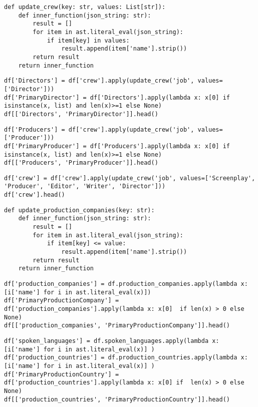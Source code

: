 \begin{lstlisting}
def update_crew(key: str, values: List[str]):
    def inner_function(json_string: str):
        result = []
        for item in ast.literal_eval(json_string):
            if item[key] in values:
                result.append(item['name'].strip())
        return result
    return inner_function
\end{lstlisting}

\begin{lstlisting}
df['Directors'] = df['crew'].apply(update_crew('job', values=['Director']))
df['PrimaryDirector'] = df['Directors'].apply(lambda x: x[0] if isinstance(x, list) and len(x)>=1 else None)
df[['Directors', 'PrimaryDirector']].head()
\end{lstlisting}

\begin{lstlisting}
df['Producers'] = df['crew'].apply(update_crew('job', values=['Producer']))
df['PrimaryProducer'] = df['Producers'].apply(lambda x: x[0] if isinstance(x, list) and len(x)>=1 else None)
df[['Producers', 'PrimaryProducer']].head()
\end{lstlisting}

\begin{lstlisting}
df['crew'] = df['crew'].apply(update_crew('job', values=['Screenplay', 'Producer', 'Editor', 'Writer', 'Director']))
df['crew'].head()
\end{lstlisting}

\begin{lstlisting}
def update_production_companies(key: str):
    def inner_function(json_string: str):
        result = []
        for item in ast.literal_eval(json_string):
            if item[key] <= value:
                result.append(item['name'].strip())
        return result
    return inner_function
\end{lstlisting}

\begin{lstlisting}
df['production_companies'] = df.production_companies.apply(lambda x: [i['name'] for i in ast.literal_eval(x)])
df['PrimaryProductionCompany'] = df['production_companies'].apply(lambda x: x[0]  if len(x) > 0 else None)
df[['production_companies', 'PrimaryProductionCompany']].head()
\end{lstlisting}

\begin{lstlisting}
df['spoken_languages'] = df.spoken_languages.apply(lambda x: [i['name'] for i in ast.literal_eval(x)] )
df['production_countries'] = df.production_countries.apply(lambda x: [i['name'] for i in ast.literal_eval(x)] )
df['PrimaryProductionCountry'] = df['production_countries'].apply(lambda x: x[0] if  len(x) > 0 else None)
df[['production_countries', 'PrimaryProductionCountry']].head()
\end{lstlisting}

